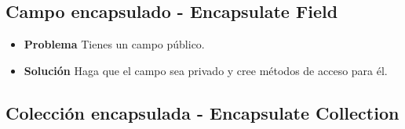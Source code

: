 \documentclass[11pt,a4paper,oneside]{book}
\begin{document}
\subsection{Campo encapsulado - Encapsulate Field}
\label{encapsulatefield}
\begin{itemize}
    \item \textbf{Problema} Tienes un campo público.
    
    \item \textbf{Solución} Haga que el campo sea privado y cree métodos de acceso para él.
    
\end{itemize}
    
\subsection{Colección encapsulada - Encapsulate Collection}
\label{encapsulatecollection}
\end{document}
